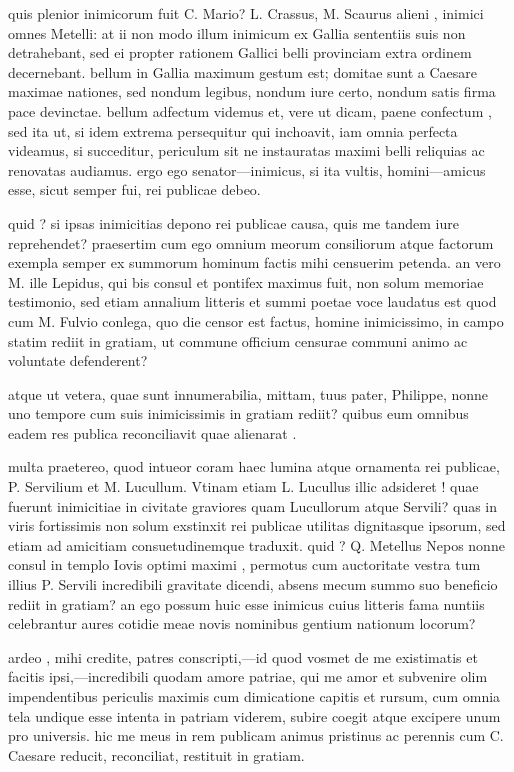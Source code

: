  quis plenior inimicorum fuit C. Mario? L. Crassus, M. Scaurus alieni , inimici omnes Metelli: at ii non modo illum inimicum ex Gallia sententiis suis non detrahebant, sed ei propter rationem Gallici belli provinciam extra ordinem decernebant. bellum in Gallia maximum gestum est; domitae sunt a Caesare maximae nationes, sed nondum legibus, nondum iure certo, nondum satis firma pace devinctae. bellum adfectum videmus et, vere ut dicam, paene confectum , sed ita ut, si idem extrema persequitur qui inchoavit, iam omnia perfecta videamus, si succeditur, periculum sit ne instauratas maximi belli reliquias ac renovatas audiamus. ergo ego senator—inimicus, si ita vultis, homini—amicus esse, sicut semper fui, rei publicae debeo.

 quid ? si ipsas inimicitias depono rei publicae causa, quis me tandem iure reprehendet? praesertim cum ego omnium meorum consiliorum atque factorum exempla semper ex summorum hominum factis mihi censuerim petenda. an vero M. ille Lepidus, qui bis consul et pontifex maximus fuit, non solum memoriae testimonio, sed etiam annalium litteris et summi poetae voce laudatus est quod cum M. Fulvio conlega, quo die censor est factus, homine inimicissimo, in campo statim rediit in gratiam, ut commune officium censurae communi animo ac voluntate defenderent?

 atque ut vetera, quae sunt innumerabilia, mittam, tuus pater, Philippe, nonne uno tempore cum suis inimicissimis in gratiam rediit? quibus eum omnibus eadem res publica reconciliavit quae alienarat .

 multa praetereo, quod intueor coram haec lumina atque ornamenta rei publicae, P. Servilium et M. Lucullum. Vtinam etiam L. Lucullus illic adsideret ! quae fuerunt inimicitiae in civitate graviores quam Lucullorum atque Servili? quas in viris fortissimis non solum exstinxit rei publicae utilitas dignitasque ipsorum, sed etiam ad amicitiam consuetudinemque traduxit. quid ? Q. Metellus Nepos nonne consul in templo Iovis optimi maximi , permotus cum auctoritate vestra tum illius P. Servili incredibili gravitate dicendi, absens mecum summo suo beneficio rediit in gratiam? an ego possum huic esse inimicus cuius litteris fama nuntiis celebrantur aures cotidie meae novis nominibus gentium nationum locorum?

 ardeo , mihi credite, patres conscripti,—id quod vosmet de me existimatis et facitis ipsi,—incredibili quodam amore patriae, qui me amor et subvenire olim impendentibus periculis maximis cum dimicatione capitis et rursum, cum omnia tela undique esse intenta in patriam viderem, subire coegit atque excipere unum pro universis. hic me meus in rem publicam animus pristinus ac perennis cum C. Caesare reducit, reconciliat, restituit in gratiam.

